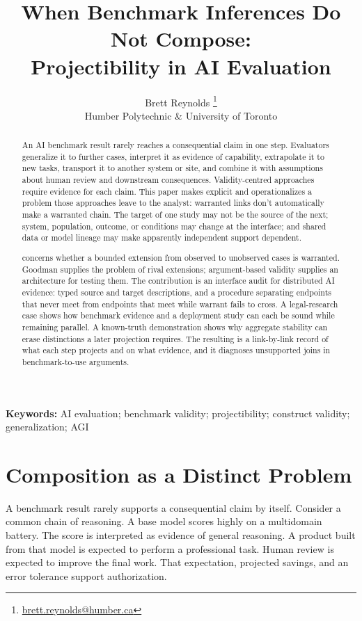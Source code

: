 \documentclass[12pt]{article}
\title{When Benchmark Inferences Do Not Compose:\\Projectibility in AI Evaluation}
\author{}
\author{Brett Reynolds \orcidlink{0000-0003-0073-7195}\thanks{\href{mailto:brett.reynolds@humber.ca}{brett.reynolds@humber.ca}}\\
  Humber Polytechnic \& University of Toronto}
\date{}
\begin{document}
\maketitle

\begin{abstract}
An AI benchmark result rarely reaches a consequential claim in one step. Evaluators generalize it to further cases, interpret it as evidence of capability, extrapolate it to new tasks, transport it to another system or site, and combine it with assumptions about human review and downstream consequences. Validity-centred approaches require evidence for each claim. This paper makes explicit and operationalizes a problem those approaches leave to the analyst: warranted links don't automatically make a warranted chain. The target of one study may not be the source of the next; system, population, outcome, or conditions may change at the interface; and shared data or model lineage may make apparently independent support dependent.

 concerns whether a bounded extension from observed to unobserved cases is warranted. Goodman supplies the problem of rival extensions; argument-based validity supplies an architecture for testing them. The contribution is an interface audit for distributed AI evidence: typed source and target descriptions, and a procedure separating endpoints that never meet from endpoints that meet while warrant fails to cross. A legal-research case shows how benchmark evidence and a deployment study can each be sound while remaining parallel. A known-truth demonstration shows why aggregate stability can erase distinctions a later projection requires. The resulting  is a link-by-link record of what each step projects and on what evidence, and it diagnoses unsupported joins in benchmark-to-use arguments.
\end{abstract}

\noindent\textbf{Keywords:} AI evaluation; benchmark validity; projectibility; construct validity; generalization; AGI


\section{Composition as a Distinct Problem}\label{sec:introduction}

A benchmark result rarely supports a consequential claim by itself. Consider a common chain of reasoning. A base model scores highly on a multidomain battery. The score is interpreted as evidence of general reasoning. A product built from that model is expected to perform a professional task. Human review is expected to improve the final work. That expectation, projected savings, and an error tolerance support authorization.
\end{document}
